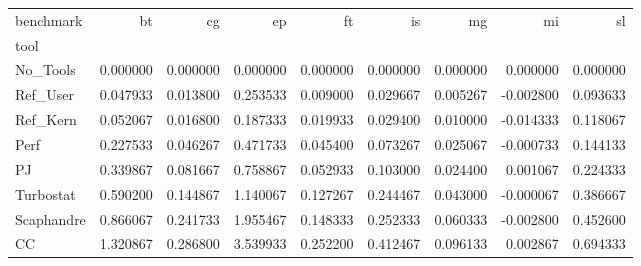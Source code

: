 \begin{tabular}{lrrrrrrrr}
\toprule
benchmark & bt & cg & ep & ft & is & mg & mi & sl \\
tool &  &  &  &  &  &  &  &  \\
\midrule
No_Tools & 0.000000 & 0.000000 & 0.000000 & 0.000000 & 0.000000 & 0.000000 & 0.000000 & 0.000000 \\
Ref_User & 0.047933 & 0.013800 & 0.253533 & 0.009000 & 0.029667 & 0.005267 & -0.002800 & 0.093633 \\
Ref_Kern & 0.052067 & 0.016800 & 0.187333 & 0.019933 & 0.029400 & 0.010000 & -0.014333 & 0.118067 \\
Perf & 0.227533 & 0.046267 & 0.471733 & 0.045400 & 0.073267 & 0.025067 & -0.000733 & 0.144133 \\
PJ & 0.339867 & 0.081667 & 0.758867 & 0.052933 & 0.103000 & 0.024400 & 0.001067 & 0.224333 \\
Turbostat & 0.590200 & 0.144867 & 1.140067 & 0.127267 & 0.244467 & 0.043000 & -0.000067 & 0.386667 \\
Scaphandre & 0.866067 & 0.241733 & 1.955467 & 0.148333 & 0.252333 & 0.060333 & -0.002800 & 0.452600 \\
CC & 1.320867 & 0.286800 & 3.539933 & 0.252200 & 0.412467 & 0.096133 & 0.002867 & 0.694333 \\
\bottomrule
\end{tabular}
